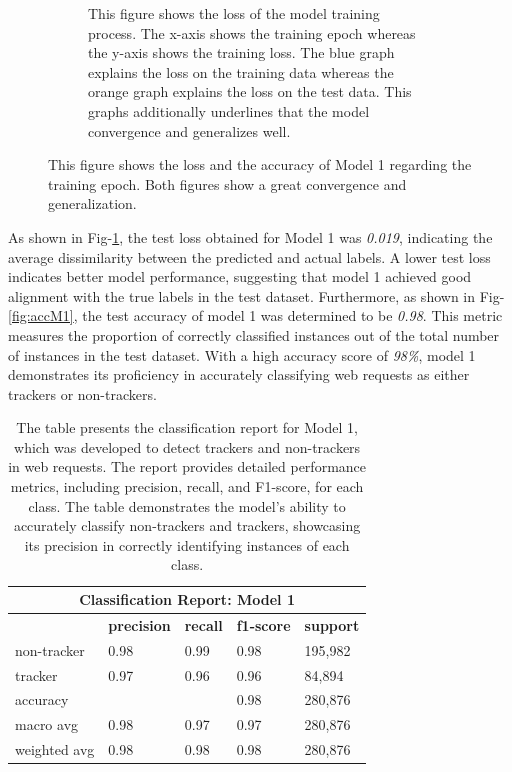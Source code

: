 \begin{figure}[ht!]
\begin{subfigure}[b]{.47\textwidth}
      \caption{This figure shows the loss of the model training process. The x-axis shows the training epoch whereas the y-axis shows
      the training loss. The blue graph explains the loss on the training data whereas the orange graph explains the loss on the test data. 
      This graphs additionally underlines that the model convergence and generalizes well.
    }
      \label{fig:lossM1}
  \end{subfigure}
  \label{}
  \caption{This figure shows the loss and the accuracy of Model 1 regarding the training epoch. Both figures show a great convergence and generalization.}
\end{figure}
As shown in Fig-\ref{fig:lossM1}, the test loss obtained for Model 1 was \emph{0.019}, indicating the average dissimilarity between the 
predicted and actual labels. A lower test loss indicates better model performance, suggesting that model 1 achieved good alignment
with the true labels in the test dataset. Furthermore, as shown in Fig-\ref{fig:accM1}, the test accuracy of model 1 was determined
to be \emph{0.98}. This metric measures the proportion of correctly classified instances out of the total number of instances in
the test dataset. With a high accuracy score of \emph{98\%}, model 1 demonstrates its proficiency in accurately classifying web
requests as either trackers or non-trackers.

\begin{table}[ht!]
  \begin{center}
    \begin{tabular}[c]{|l|l|l|l|l|}
      \hline
      \multicolumn{5}{|c|}{\textbf{Classification Report: Model 1}} \\
      \hline
      \textbf{} & \textbf{precision} & \textbf{recall} & \textbf{f1-score} & \textbf{support} \\
      \hline
      non-tracker & 0.98 & 0.99 & 0.98 & 195,982 \\
      \hline
      tracker & 0.97 & 0.96 & 0.96 & 84,894 \\
      \hline
      accuracy & & & 0.98 & 280,876 \\
      \hline
      macro avg & 0.98 & 0.97 & 0.97 & 280,876 \\
      \hline
      weighted avg & 0.98 & 0.98 & 0.98 & 280,876 \\
      
      \hline
    \end{tabular}
  \end{center}
  \caption{The table presents the classification report for Model 1, which was developed to detect trackers and non-trackers
  in web requests. The report provides detailed performance metrics, including precision, recall, and F1-score, for each class.
The table demonstrates the model's ability to accurately classify non-trackers and trackers, showcasing
its precision in correctly identifying instances of each class.}
  \label{tab:m1}
\end{table}

